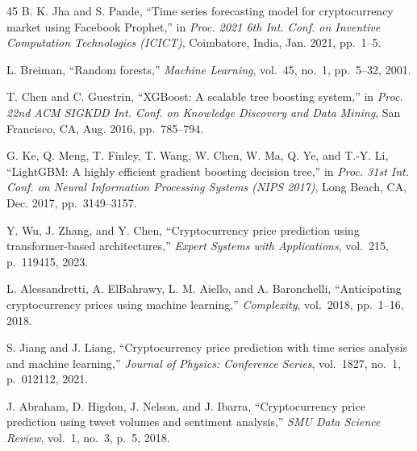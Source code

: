 \documentclass[conference]{IEEEtran}
\begin{document}
\begin{thebibliography}{45}
B. K. Jha and S. Pande, ``Time series forecasting model for cryptocurrency market using Facebook Prophet,'' in \textit{Proc. 2021 6th Int. Conf. on Inventive Computation Technologies (ICICT)}, Coimbatore, India, Jan. 2021, pp.~1--5.

L. Breiman, ``Random forests,'' \textit{Machine Learning}, vol.~45, no.~1, pp.~5--32, 2001.

T. Chen and C. Guestrin, ``XGBoost: A scalable tree boosting system,'' in \textit{Proc. 22nd ACM SIGKDD Int. Conf. on Knowledge Discovery and Data Mining}, San Francisco, CA, Aug. 2016, pp.~785--794.

G. Ke, Q. Meng, T. Finley, T. Wang, W. Chen, W. Ma, Q. Ye, and T.-Y. Li, ``LightGBM: A highly efficient gradient boosting decision tree,'' in \textit{Proc. 31st Int. Conf. on Neural Information Processing Systems (NIPS 2017)}, Long Beach, CA, Dec. 2017, pp.~3149--3157.

Y. Wu, J. Zhang, and Y. Chen, ``Cryptocurrency price prediction using transformer-based architectures,'' \textit{Expert Systems with Applications}, vol.~215, p.~119415, 2023.

L. Alessandretti, A. ElBahrawy, L. M. Aiello, and A. Baronchelli, ``Anticipating cryptocurrency prices using machine learning,'' \textit{Complexity}, vol.~2018, pp.~1--16, 2018.

S. Jiang and J. Liang, ``Cryptocurrency price prediction with time series analysis and machine learning,'' \textit{Journal of Physics: Conference Series}, vol.~1827, no.~1, p.~012112, 2021.

J. Abraham, D. Higdon, J. Nelson, and J. Ibarra, ``Cryptocurrency price prediction using tweet volumes and sentiment analysis,'' \textit{SMU Data Science Review}, vol.~1, no.~3, p.~5, 2018.

\end{thebibliography}
\end{document}
